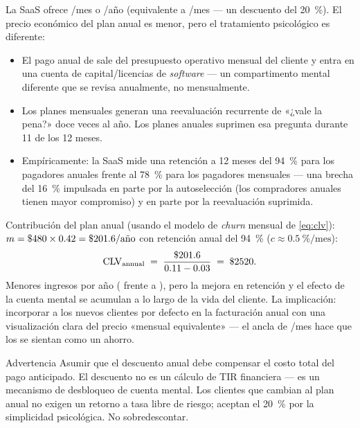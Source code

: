 \begin{example}
La SaaS ofrece /mes o /año (equivalente a /mes --- un descuento del \qty{20}{\percent}). El precio económico del plan anual es menor, pero el tratamiento psicológico es diferente:

\begin{itemize}
  \item El pago anual de  sale del presupuesto operativo mensual del cliente y entra en una cuenta de capital/licencias de \emph{software} --- un compartimento mental diferente que se revisa anualmente, no mensualmente.
  \item Los planes mensuales generan una reevaluación recurrente de «¿vale la pena?» doce veces al año. Los planes anuales suprimen esa pregunta durante 11 de los 12 meses.
  \item Empíricamente: la SaaS mide una retención a 12 meses del \qty{94}{\percent} para los pagadores anuales frente al \qty{78}{\percent} para los pagadores mensuales --- una brecha del \qty{16}{\percent} impulsada en parte por la autoselección (los compradores anuales tienen mayor compromiso) y en parte por la reevaluación suprimida.
\end{itemize}

Contribución del plan anual (usando el modelo de \emph{churn} mensual de \cref{eq:clv}): \(m = \$\num{480} \times 0.42 = \$\num{201.6}/\text{año}\) con retención anual del \qty{94}{\percent} (\(c \approx \qty{0.5}{\percent}/\text{mes}\)):
\[
  \mathrm{CLV}_{\text{annual}} \;=\; \frac{\$\num{201.6}}{0.11 - 0.03} \;=\; \$\num{2520}.
\]
Menores ingresos por año ( frente a ), pero la mejora en retención y el efecto de la cuenta mental se acumulan a lo largo de la vida del cliente. La implicación: incorporar a los nuevos clientes por defecto en la facturación anual con una visualización clara del precio «mensual equivalente» --- el ancla de /mes hace que los  se sientan como un ahorro.
\end{example}

\begin{admonition}{Advertencia}
Asumir que el descuento anual debe compensar el costo total del pago anticipado. El descuento no es un cálculo de TIR financiera --- es un mecanismo de desbloqueo de cuenta mental. Los clientes que cambian al plan anual no exigen un retorno a tasa libre de riesgo; aceptan el \qty{20}{\percent} por la simplicidad psicológica. No sobredescontar.
\end{admonition}

